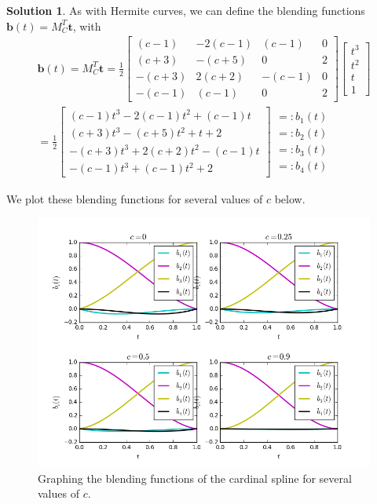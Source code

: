 \documentclass[10pt]{article}
\theoremstyle{plain}
\theoremstyle{definition}
\newtheorem*{soln*}{Solution}
\numberwithin{equation}{section}
\begin{document}
\begin{soln*}
    As with Hermite curves, we can define the blending functions
    $\bm{b}(t) = M_C^T \bm{t}$, with
    \begin{align*}
    \bm{b}(t) = M_C^T \bm{t}
              = 
            \frac{1}{2} \begin{bmatrix}
                (c-1)   & -2(c-1)   & (c-1)     & 0         \\
                (c+3)   & -(c+5)    & 0         & 2         \\
                -(c+3)  & 2(c+2)    & -(c-1)    & 0         \\
                -(c-1)  & (c-1)     & 0         & 2
            \end{bmatrix}
    \begin{bmatrix} t^3 \\ t^2 \\ t \\ 1 \end{bmatrix} \\
          =  \frac{1}{2} \begin{bmatrix}
              (c-1)   t^3 -2(c-1) t^2  + (c-1)  t \\ 
              (c+3)   t^3 -(c+5)  t^2    +     t   + 2         \\
              -(c+3)  t^3 + 2(c+2)  t^2  -(c-1) t  \\ 
              -(c-1)  t^3 + (c-1)   t^2  + 2
            \end{bmatrix}
            \begin{matrix}
                =: b_1(t) \\
                =: b_2(t) \\
                =: b_3(t) \\
                =: b_4(t) 
            \end{matrix}
    \end{align*}

We plot these blending functions for several values of $c$ below.
\begin{figure}[h]
    \centering
    \includegraphics[width=1\textwidth]{cardinals}
    \caption{Graphing the blending functions of the cardinal spline for several values of $c$.}
\end{figure}
\end{soln*}
\end{document}
